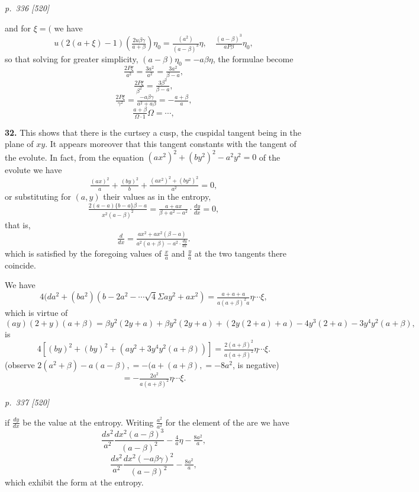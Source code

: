 \documentclass[11pt,a4paper]{book}
\begin{document}
\clearpage

\bigskip
\textit{p.~336 [520]}
\smallskip

and for $\xi = ($ we have
\[
u(2(a + \xi) - 1)\!\left(\tfrac{2u\beta\gamma}{a + \beta}\right)\eta_0 = \tfrac{(a^2)}{(a - \beta)^3}\eta, \quad \tfrac{(a - \beta)^3}{a P\beta}\eta_0,
\]
so that solving for greater simplicity, $(a - \beta)\eta_0 = -a\beta\eta$, the formulae become
\[
\tfrac{2P\xi}{a^2} = \tfrac{3a^2}{a^2} = \tfrac{3a^2}{\beta - a},
\]
\[
\tfrac{2P\xi}{\beta^2} = \tfrac{3\beta^2}{\beta - a},
\]
\[
\tfrac{2P\xi}{\gamma^2} = \tfrac{-a\beta\gamma}{a^2 + a\beta} = -\tfrac{a + \beta}{a},
\]
\[
\tfrac{a + \beta}{\Omega \cdot 1}\Omega = \cdots,
\]

\textbf{32.} This shows that there is the curtsey a cusp, the cuspidal tangent being in the plane of $xy$. It appears moreover that this tangent constants with the tangent of the evolute. In fact, from the equation $(a x^2)^2 + (b y^2)^2 - a^2 y^2 = 0$ of the evolute we have
\[
\tfrac{(a x)^2}{a} + \tfrac{(b y)^2}{b} + \tfrac{(a x^2)^2 + (b y^2)^2}{a^2} = 0,
\]
or substituting for $(a, y)$ their values as in the entropy,
\[
\tfrac{2(a - a)\{b - a\}\beta - a}{x^2(a - \beta)^2} = \tfrac{a + a x}{\beta + a^2 - a^2}\cdot\tfrac{dy}{dx} = 0,
\]
that is,
\[
\tfrac{d}{dx} = \tfrac{a x^2 + a x^2(\beta - a)}{a^2(a + \beta) - a^2\cdot\tfrac{dy}{dx}}.
\]
which is satisfied by the foregoing values of $\tfrac{x}{a}$ and $\tfrac{y}{a}$ at the two tangents there coincide.

We have
\[
4(da^2 + (b a^2)(b - 2a^2 - \cdots\sqrt{4}\Sigma a y^2 + a x^2) = \tfrac{a + a + a}{a(a + \beta)^2 a}\eta\cdots\xi,
\]
which is virtue of
\[
(a y)(2 + y)(a + \beta) = \beta y^2(2y + a) + \beta y^2(2y + a) + (2y(2 + a) + a) - 4y^3(2 + a) - 3y^4 y^2(a + \beta),
\]
is
\[
4[(b y)^2 + (b y)^2 + (a y^2 + 3y^4 y^2(a + \beta))] = \tfrac{2(a + \beta)^2}{a(a + \beta)^2}\eta\cdots\xi.
\]
(observe $2(a^2 + \beta) - a(a - \beta), = -(a + (a + \beta), = -8a^2$, is negative)
\[
= -\tfrac{2a^2}{a(a + \beta)^2}\eta\cdots\xi.
\]

\clearpage

\bigskip
\textit{p.~337 [520]}
\smallskip

if $\tfrac{dy}{dx}$ be the value at the entropy. Writing $\tfrac{a^2}{a^2}$ for the element of the are we have
\[
\frac{ds^2}{a^2}\frac{dx^2(a - \beta)^3}{(a - \beta)^2} - \tfrac{4}{a}\eta - \tfrac{8a^2}{a},
\]
\[
\frac{ds^2}{a^2}\frac{dx^2(- a\beta\gamma)^2}{(a - \beta)^2} - \tfrac{8a^2}{a},
\]
which exhibit the form at the entropy.
\end{document}
